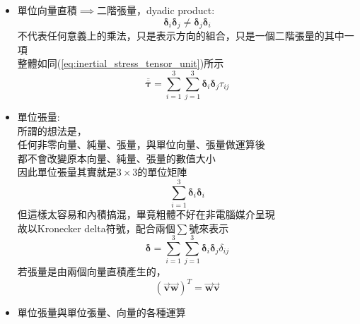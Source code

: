 \documentclass[../main.tex]{subfiles}
\begin{document}
\begin{itemize}
\begin{itemize}
\begin{equation}
        \end{equation}
        如果要寫的不直觀的話，也可以寫成:
        \begin{equation}
          \varepsilon_{ijk} = \frac{1}{2}(i-j)(j-k)(k-i)
        \end{equation}
        例如$\varepsilon_{123} = \frac{1}{2}(1-2)(2-3)(3-1) = +1$\\
        例如$\varepsilon_{132} = \frac{1}{2}(1-3)(3-2)(2-1) = -1$\\
        例如$\varepsilon_{112} = \frac{1}{2}(1-1)(1-2)(2-1) = 0$
      \item 單位向量直積$\implies$二階張量，dyadic product:
        \begin{equation}
          \bm \delta_i \bm \delta_j \neq \bm \delta_j \bm \delta_i
        \end{equation}
        不代表任何意義上的乘法，只是表示方向的組合，只是一個二階張量的其中一項\\
        整體如同(\ref{eq:inertial_stress_tensor_unit})所示
        \begin{equation}
          \overline{\overline{\bm \tau}} = \sum_{i=1}^3\sum_{j=1}^3 \bm \delta_i \bm \delta_j\tau_{ij} 
        \end{equation}
      \item 單位張量:\\
        所謂的想法是，\\
        任何非零向量、純量、張量，與單位向量、張量做運算後\\
        都不會改變原本向量、純量、張量的數值大小\\
        因此單位張量其實就是$3\times 3$的單位矩陣
        \begin{equation}
          \sum_{i=1}^3 \bm\delta_i \bm \delta_i
        \end{equation}
        但這樣太容易和內積搞混，畢竟粗體不好在非電腦媒介呈現\\
        故以Kronecker delta符號，配合兩個$\sum$號來表示
        \begin{equation}
          \boxed{\bm \delta = \sum_{i=1}^3\sum_{j=1}^3 \bm \delta_i \bm \delta_j \delta_{ij} }
        \end{equation}
        若張量是由兩個向量直積產生的，
        \begin{equation}
          (\vec {\bm v} \vec {\bm w})^T = \vec {\bm w} \vec {\bm v}
        \end{equation}
      \item 單位張量與單位張量、向量的各種運算\\

\end{itemize}
\end{itemize}
\end{document}
